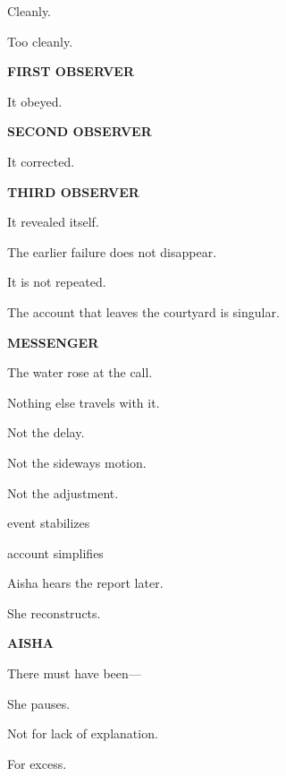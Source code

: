 Cleanly.

\medskip

Too cleanly.

\medskip

\textbf{FIRST OBSERVER}

It obeyed.

\medskip

\textbf{SECOND OBSERVER}

It corrected.

\medskip

\textbf{THIRD OBSERVER}

It revealed itself.

\medskip

The earlier failure does not disappear.

It is not repeated.

\medskip


\medskip

The account that leaves the courtyard is singular.

\medskip

\textbf{MESSENGER}

The water rose at the call.

\medskip

Nothing else travels with it.

\medskip

Not the delay.

Not the sideways motion.

Not the adjustment.

\medskip

 event stabilizes

 account simplifies

\medskip

Aisha hears the report later.

She reconstructs.

\medskip

\textbf{AISHA}

There must have been---

\medskip

She pauses.

Not for lack of explanation.

For excess.

\medskip

